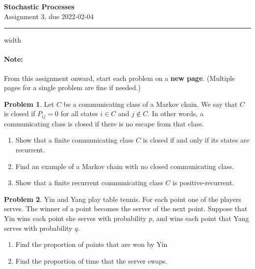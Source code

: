 \documentclass{article}
\theoremstyle{definition}
\newtheorem{problem}{Problem}
\begin{document}
\thispagestyle{crfooter}

\begin{center}
  {\LARGE \textbf{Stochastic Processes}} \\
  {\Large Assignment 3, due 2022-02-04}
\end{center}

\hrule width \textwidth \bigskip

\paragraph{Note:} From this assignment onward, start each problem on a \textbf{new page}. (Multiple pages for a single problem are fine if needed.)


\begin{problem}
  Let $C$ be a communicating class of a Markov chain.
  We say that $C$ is closed if $P_{ij} = 0$ for all states $i\in C$ and $j\not\in C$.
  In other words, a communicating class is closed if there is no escape from that class.
  \begin{enumerate}
  \item Show that a finite communicating class $C$ is closed if and only if its states are recurrent.
  \item Find an example of a Markov chain with no closed communicating class.
  \item Show that a finite recurrent communicating class $C$ is positive-recurrent.
  \end{enumerate}
\end{problem}


\begin{problem}
  Yin and Yang play table tennis.
  For each point one of the players serves.
  The winner of a point becomes the server of the next point.
  Suppose that Yin wins each point she serves with probability $p$, and wins each point that Yang serves with probability $q$.
  \begin{enumerate}
  \item Find the proportion of points that are won by Yin
  \item Find the proportion of time that the server swaps.
  \end{enumerate}
\end{problem}

\end{document}
